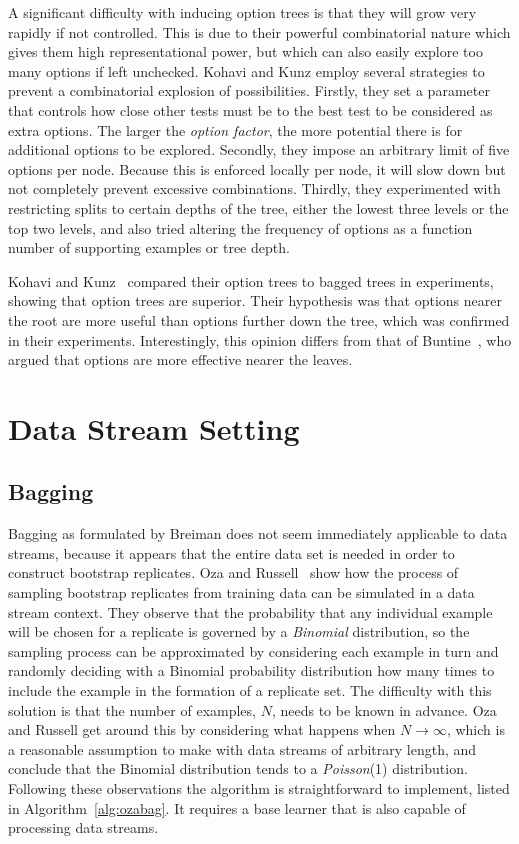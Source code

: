 A significant difficulty with inducing option trees is that they will grow very rapidly if not controlled. This is due to their powerful combinatorial nature which gives them high representational power, but which can also easily explore too many options if left unchecked. Kohavi and Kunz employ several strategies to prevent a combinatorial explosion of possibilities. Firstly, they set a parameter that controls how close other tests must be to the best test to be considered as extra options. The larger the {\em option factor}, the more potential there is for additional options to be explored. Secondly, they impose an arbitrary limit of five options per node. Because this is enforced locally per node, it will slow down but not completely prevent excessive combinations. Thirdly, they experimented with restricting splits to certain depths of the tree, either the lowest three levels or the top two levels, and also tried altering the frequency of options as a function number of supporting examples or tree depth.

Kohavi and Kunz~\cite{kohaviot} compared their option trees to bagged trees in experiments, showing that option trees are superior.
Their hypothesis was that options nearer the root are more useful than options further down the tree, which was confirmed in their experiments. Interestingly, this opinion differs from that of Buntine~\cite{buntinetrees}, who argued that options are more effective nearer the leaves.

\section{Data Stream Setting}
\label{sec:streamimprove}

\subsection{Bagging}
\label{sec:baggingstream}

Bagging as formulated by Breiman does not seem immediately applicable to data streams, because it appears that the entire data set is needed in order to construct bootstrap replicates. Oza and Russell~\cite{ozabagboost} show how the process of sampling bootstrap replicates from training data can be simulated in a data stream context. They observe that the probability that any individual example will be chosen for a replicate is governed by a {\em Binomial} distribution, so the sampling process can be approximated by considering each example in turn and randomly deciding with a Binomial probability distribution how many times to include the example in the formation of a replicate set. The difficulty with this solution is that the number of examples, $N$, needs to be known in advance. Oza and Russell get around this by considering what happens when $N \to \infty$, which is a reasonable assumption to make with data streams of arbitrary length, and conclude that the Binomial distribution tends to a {\em Poisson}(1) distribution. Following these observations the algorithm is straightforward to implement, listed in Algorithm~\ref{alg:ozabag}. It requires a base learner that is also capable of processing data streams.

